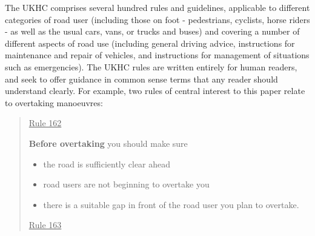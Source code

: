 The UKHC comprises several hundred rules and guidelines, applicable to different categories of road user (including those on foot - pedestrians, cyclists, horse riders - as well as the usual cars, vans, or trucks and buses) and covering a number of different aspects of road use (including general driving advice, instructions for maintenance and repair of vehicles, and instructions for management of situations such as emergencies). The UKHC rules are written entirely for human readers, and seek to offer guidance in common sense terms that any reader should understand clearly. For example, two rules of central interest to this paper relate to overtaking manoeuvres:

\begin{quote}
    \underline{Rule 162}
    
    \textbf{Before overtaking} you should make sure
    \begin{itemize}
        \item the road is sufficiently clear ahead
        \item road users are not beginning to overtake you
        \item there is a suitable gap in front of the road user you plan to overtake.
    \end{itemize}
	\vspace{8mm}	%
    \underline{Rule 163}
    

\end{quote}
